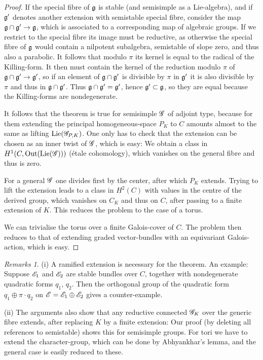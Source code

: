 \documentclass[12pt,english]{smfart}
\theoremstyle{plain} \newtheorem{innerthm}{Theorem} \newtheorem{innerlem}{Lemma} \newtheorem{innerprop}{Proposition} \newtheorem{innercor}{Corollary} \theoremstyle{definition} \newtheorem{innerdefn}{Definition} \newtheorem{innerconstr}{Construction} \theoremstyle{remark} \newtheorem*{remark}{Remark} \newtheorem*{remarks}{Remarks} \newtheorem*{applications}{Applications}
\begin{document}
\begin{proof}
If the special fibre of $\mathfrak{g}$ is stable (and semisimple as a Lie-algebra), and if $\mathfrak{g}'$ denotes another extension with semistable special fibre, consider the map $\mathfrak{g}\cap\mathfrak{g}'\to\mathfrak{g}$, which is associated to a corresponding map of algebraic
groups. If we restrict to the special fibre its image must be reductive, as otherwise the special fibre of $\mathfrak{g}$ would contain a nilpotent subalgebra, semistable of slope zero, and thus also a parabolic. It follows that modulo $\pi$ its kernel is equal to the radical of the Killing-form. It then must contain the kernel of the reduction modulo $\pi$ of $\mathfrak{g}\cap\mathfrak{g}'\to\mathfrak{g}'$, so if an element of $\mathfrak{g}\cap\mathfrak{g}'$ is divisible by $\pi$ in $\mathfrak{g}'$ it is also divisible by $\pi$ and thus in $\mathfrak{g}\cap\mathfrak{g}'$. Thus $\mathfrak{g}\cap\mathfrak{g}'=\mathfrak{g}'$, hence $\mathfrak{g}'\subset\mathfrak{g}$, so they are equal because the Killing-forms are nondegenerate.

It follows that the theorem is true for semisimple $\mathscr{G}$ of adjoint type, because for them extending the principal homogeneous-space $P_K$ to $C$ amounts almost to the same as lifting $\operatorname{Lie}(\mathscr{G}_{P,K})$. One only has to check that the extension can be chosen as an inner twist of $\mathscr{G}$, which is easy: We obtain a class in $H^1(C,\operatorname{Out}(\operatorname{Lie}(\mathscr{G})))$ (\'etale cohomology), which vanishes on the general fibre and thus is zero.

For a general $\mathscr{G}$ one divides first by the center, after which $P_K$ extends. Trying to lift the extension leads to a class in $H^2(C)$ with values in the centre of the derived group, which vanishes on $C_K$ and thus on $C$, after passing to a finite extension of $K$. This reduces the problem to the case of a torus.

We can trivialise the torus over a finite Galois-cover of $C$. The problem then reduces to that of extending graded vector-bundles with an equivariant Galois-action, which is easy.
\end{proof}

\begin{remarks}
(i) A ramified extension is necessary for the theorem. An example: Suppose $\mathscr{E}_1$ and $\mathscr{E}_2$ are stable bundles over $C$, together with nondegenerate quadratic forms $q_1$, $q_2$. Then the orthogonal group of the quadratic form $q_1\oplus\pi\cdot q_2$ on $\mathscr{E}=\mathscr{E}_1\oplus\mathscr{E}_2$ gives a counter-example.

(ii) The arguments also show that any reductive connected $\mathscr{G}_K$ over the generic fibre extends, after replacing $K$ by a finite extension: Our proof (by deleting all references to semistable) shows this for semisimple groups. For tori we have to extend the character-group, which can be done by Abhyankhar's lemma, and the general case is easily reduced to these.
\end{remarks}
\end{document}
